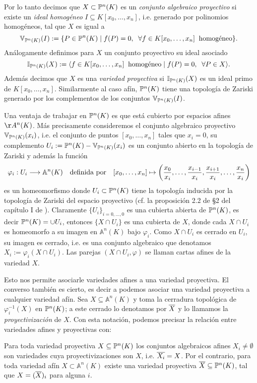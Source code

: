 Por lo tanto decimos que $X\subset\mathbb{P}^n(K)$ es un \emph{conjunto algebraico proyectivo} si existe un \emph{ideal homogéneo} $I\subseteq K[x_0,\ldots,x_n]$, i.e. generado por polinomios homogéneos, tal que $X$ es igual a
\[
	\mathbb{V}_{\mathbb{P}^n(K)}(I):=\{P\in\mathbb{P}^n(K)\mid f(P)=0,\;\;\forall f\in K[x_0,\ldots,x_n]\;\;\text{homogéneo}\}.
\]
Análogamente definimos para $X$ un conjunto proyectivo su ideal asociado
\[
	\mathbb{I}_{\mathbb{P}^n(K)}(X):=\langle f\in K[x_0,\ldots,x_n]\;\;\text{homogéneo}\mid f(P)=0,\;\;\forall P\in X \rangle.
\]
Además decimos que $X$ es una \emph{variedad proyectiva} si $\mathbb{I}_{\mathbb{P}^n(K)}(X)$ es un ideal primo de $K[x_0,\ldots,x_n]$. Similarmente al caso afín, $\mathbb{P}^n(K)$ tiene una topología de Zariski generado por los complementos de los conjuntos $\mathbb{V}_{\mathbb{P}^n(K)}(I)$.

Una ventaja de trabajar en $\mathbb{P}^n(K)$ es que está cubierto por espacios afines $\AA^n(K)$. Más precisamente consideremos el conjunto algebraico proyectivo $\mathbb{V}_{\mathbb{P}^n(K)}(x_i)$, i.e. el conjunto de puntos $[x_0,\ldots,x_n]$ tales que $x_i=0$, su complemento $U_i:=\mathbb{P}^n(K)-\mathbb{V}_{\mathbb{P}^n(K)}(x_i)$ es un conjunto abierto en la topología de Zariski y además la función
\[
	\varphi_i:U_i\longrightarrow\mathbb{A}^n(K)\quad\text{definida por}\quad [x_0,\ldots,x_n]\mapsto \left( \frac{x_0}{x_i},\ldots,\frac{x_{i-1}}{x_i},\frac{x_{i+1}}{x_i},\ldots,\frac{x_n}{x_i} \right)
\]
es un homeomorfismo donde $U_i\subset\mathbb{P}^n(K)$ tiene la topología inducida por la topología de Zariski del espacio proyectivo (cf. la proposición 2.2 de \S2 del capítulo I de \cite{HartshorneAG}). Claramente $\{U_i\}_{i=0,\ldots,0}$ es una cubierta abierta de $\mathbb{P}^n(K)$, es decir $\mathbb{P}^n(K)=\cup U_i$, entonces $\{X\cap U_i\}$ es una cubierta de $X$, donde cada $X\cap U_i$ es homeomorfo a su imagen en $\mathbb{A}^n(K)$ bajo $\varphi_i$. Como $X\cap U_i$ es cerrado en $U_i$, su imagen es cerrado, i.e. es una conjunto algebraico que denotamos $X_i:=\varphi_i(X\cap U_i)$. Las parejas $(X\cap U_i,\varphi)$ se llaman cartas afines de la variedad $X$.

Esto nos permite asociarle variedades afines a una variedad proyectiva. El converso también es cierto, es decir a podemos asociar una variedad proyectiva a cualquier variedad afín. Sea $X\subseteq\mathbb{A}^n(K)$ y toma la cerradura topológica de $\varphi_i^{-1}(X)$ en $\mathbb{P}^n(K)$; a este cerrado lo denotamos por $\overline{X}$ y lo llamamos la \emph{proyectivización} de $X$. Con esta notación, podemos precisar la relación entre variedades afines y proyectivas con:

\begin{prop}
Para toda variedad proyectiva $X\subseteq\mathbb{P}^n(K)$ los conjuntos algebraicos afines $X_i\neq\emptyset$ son variedades cuya proyectivizaciones son $X$, i.e. $\overline{X_i}=X$.	Por el contrario, para toda variedad afín $X\subset\mathbb{A}^n(K)$ existe una variedad proyectiva $\overline{X}\subseteq\mathbb{P}^n(K)$, tal que $X=(\overline{X})_i$ para alguna $i$.
\end{prop}

